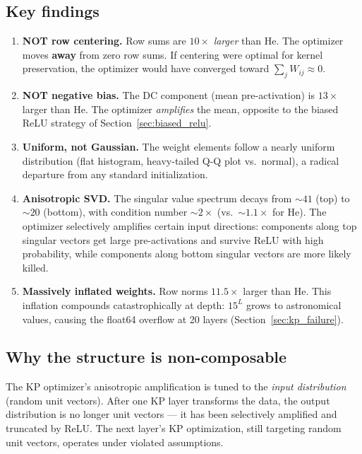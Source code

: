 \subsection{Key findings}

\begin{enumerate}
  \item \textbf{NOT row centering.}
        Row sums are $10\times$ \emph{larger} than He.
        The optimizer moves \textbf{away} from zero row sums.
        If centering were optimal for kernel preservation, the optimizer
        would have converged toward $\sum_j W_{ij} \approx 0$.

  \item \textbf{NOT negative bias.}
        The DC component (mean pre-activation) is $13\times$ larger than He.
        The optimizer \emph{amplifies} the mean, opposite to the biased
        ReLU strategy of Section~\ref{sec:biased_relu}.

  \item \textbf{Uniform, not Gaussian.}
        The weight elements follow a nearly uniform distribution (flat
        histogram, heavy-tailed Q-Q plot vs.\ normal), a radical departure
        from any standard initialization.

  \item \textbf{Anisotropic SVD.}
        The singular value spectrum decays from $\sim\!41$ (top) to
        $\sim\!20$ (bottom), with condition number $\sim\!2\times$
        (vs.\ $\sim\!1.1\times$ for He).
        The optimizer selectively amplifies certain input directions:
        components along top singular vectors get large pre-activations
        and survive ReLU with high probability, while components along
        bottom singular vectors are more likely killed.

  \item \textbf{Massively inflated weights.}
        Row norms $11.5\times$ larger than He.
        This inflation compounds catastrophically at depth:
        $15^L$ grows to astronomical values, causing the float64
        overflow at 20 layers (Section~\ref{sec:kp_failure}).
\end{enumerate}

\subsection{Why the structure is non-composable}

The KP optimizer's anisotropic amplification is tuned to the
\emph{input distribution} (random unit vectors).  After one KP layer
transforms the data, the output distribution is no longer unit vectors
--- it has been selectively amplified and truncated by ReLU.
The next layer's KP optimization, still targeting random unit vectors,
operates under violated assumptions.

